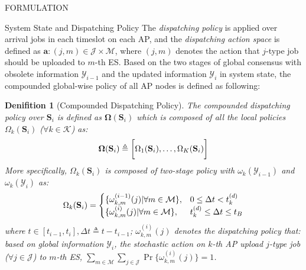 \documentclass[10pt, conference, letterpaper]{IEEEtran}
\newtheorem{definition}{Denifition}
\newcommand{\define}{\triangleq}
\renewcommand{\vec}{\mathbf}
\DeclarePairedDelimiter{\set}{\{}{\}}
\DeclarePairedDelimiter{\Bracket}{\bigg[}{\bigg]}
\newcommand{\apSet}{\mathcal{K}}
\newcommand{\esSet}{\mathcal{M}}
\newcommand{\jSpace}{\mathcal{J}}
\newcommand{\Stat}{\mathbf{S}}
\newcommand{\Obsv}{\mathcal{Y}}
\newcommand{\Policy}{\mathbf{\Omega}}
\begin{document}
\begin{section}{FORMULATION}
\begin{subsection}{System State and Dispatching Policy}
            The \emph{dispatching policy} is applied over arrival jobs in each timeslot on each AP, and the \emph{dispatching action space} is defined as $\vec{a}: (j, m) \in \jSpace \times \esSet$, where $(j, m)$ denotes the action that $j$-type job should be uploaded to $m$-th ES. Based on the two stages of global consensus with obsolete information $\Obsv_{i-1}$ and the updated information $\Obsv_{i}$ in system state, the compounded global-wise policy of all AP nodes is defined as following:
            \begin{definition}[Compounded Dispatching Policy]
                The compounded dispatching policy over $\Stat_{i}$ is defined as $\Policy(\Stat_{i})$ which is composed of all the local policies $\Omega_k(\Stat_{i})$ ($\forall k\in\apSet$) as:
                \begin{align}
                    \vec{\Omega}(\Stat_{i}) \define \Bracket{\Omega_1(\Stat_{i}), \dots, \Omega_K(\Stat_{i})}
                \end{align}
                More specifically, $\Omega_k(\Stat_{i})$ is composed of two-stage policy with $\omega_k(\Obsv_{i-1})$ and $\omega_k(\Obsv_{i})$ as:
                \begin{align}
                    \Omega_k(\Stat_i) = 
                    \begin{cases}
                        \set{\omega^{(i-1)}_{k,m}(j)|\forall m\in\esSet}, & 0 \leq \Delta{t} < t^{(d)}_k
                        \\
                        \set{\omega^{(i)}_{k,m}(j)|\forall m\in\esSet}, & t^{(d)}_k \leq \Delta{t} \leq t_B
                    \end{cases}
                \end{align}
                where $t\in[t_{i-1}, t_{i}], \Delta{t} \define t - t_{i-1}$; $\omega^{(i)}_{k,m}(j)$ denotes the dispatching policy that: based on global information $\Obsv_{i}$, the stochastic action on $k$-th AP upload $j$-type job ($\forall j\in\jSpace$) to $m$-th ES, $\sum_{m\in\esSet}\sum_{j\in\jSpace} \Pr\{\omega^{(i)}_{k,m}(j)\}=1$.
            \end{definition}
        \end{subsection}


\end{section}
\end{document}
